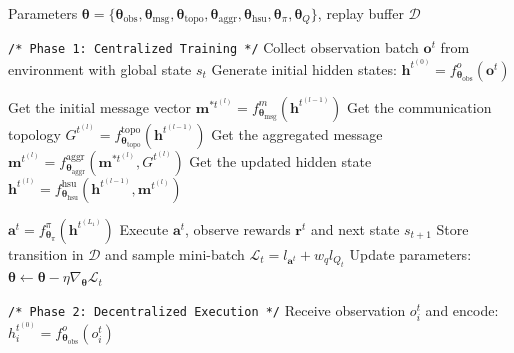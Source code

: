 \begin{algorithm}[!t]
\label{algo:EC-MARL}
\caption{Protocol Learning of MARL: Centralized Training with Decentralized Execution}
\begin{algorithmic}[1]

 Parameters $\boldsymbol{\theta} = \{\boldsymbol{\theta}_\text{obs}, \boldsymbol{\theta}_\text{msg}, \boldsymbol{\theta}_\text{topo}, \boldsymbol{\theta}_\text{aggr}, \boldsymbol{\theta}_\text{hsu}, \boldsymbol{\theta}_\pi, \boldsymbol{\theta}_Q\}$, replay buffer $\mathcal{D}$

\STATE \texttt{/* Phase 1: Centralized Training */}
    \STATE Collect observation batch $\mathbf{o}^t$ from environment with global state $s_t$
    \STATE Generate initial hidden states: $\mathbf{h}^{t^{(0)}} = f_{\boldsymbol{\theta}_\text{obs}}^o(\mathbf{o}^t)$
    
        \STATE Get the initial message vector $\mathbf{m}^{*t^{(l)}} = f_{\boldsymbol{\theta}_\text{msg}}^m(\mathbf{h}^{t^{(l-1)}})$ 
        \STATE Get the communication topology $G^{t^{(l)}} = f_{\boldsymbol{\theta}_\text{topo}}^\text{topo}(\mathbf{h}^{t^{(l-1)}})$ 
        \STATE Get the aggregated message $\mathbf{m}^{t^{(l)}} = f_{\boldsymbol{\theta}_\text{aggr}}^\text{aggr}(\mathbf{m}^{*t^{(l)}}, G^{t^{(l)}})$ 
        \STATE Get the updated hidden state $\mathbf{h}^{t^{(l)}} = f_{\boldsymbol{\theta}_\text{hsu}}^\text{hsu}(\mathbf{h}^{t^{(l-1)}}, \mathbf{m}^{t^{(l)}})$ 
    \ENDFOR
    
    \STATE $\mathbf{a}^t = f_{\boldsymbol{\theta}_\pi}^{\pi}(\mathbf{h}^{t^{(L_1)}})$ 
    \STATE Execute $\mathbf{a}^t$, observe rewards $\mathbf{r}^t$ and next state $s_{t+1}$
    \STATE Store transition in $\mathcal{D}$ and sample mini-batch
    \STATE $\mathcal{L}_t = l_{\mathbf{a}^t} + w_q l_{Q_t}$ 
    \vspace{2mm}
    \STATE Update parameters: $\boldsymbol{\theta} \leftarrow \boldsymbol{\theta} - \eta \nabla_{\boldsymbol{\theta}} \mathcal{L}_t$
\ENDWHILE

\STATE \texttt{/* Phase 2: Decentralized Execution */}
        \STATE Receive observation $o_i^t$ and encode: $h_i^{t^{(0)}} = f_{\boldsymbol{\theta}_\text{obs}}^o(o_i^t)$
    \ENDFOR
    

\end{algorithmic}
\end{algorithm}
